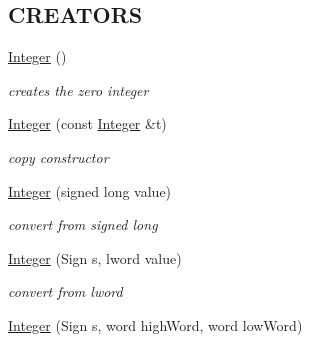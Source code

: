 \subsection*{CREATORS}
\label{_amgrp19ed50dd7d15a96072c9b6a53e8d6a1d}
 \begin{DoxyCompactItemize}
\item 
\hypertarget{class_integer_a7fcab0564d7270017ebcca55bae1a17a}{
\hyperlink{class_integer_a7fcab0564d7270017ebcca55bae1a17a}{Integer} ()}
\label{class_integer_a7fcab0564d7270017ebcca55bae1a17a}

\begin{DoxyCompactList}\small\item\em creates the zero integer \item\end{DoxyCompactList}\item 
\hypertarget{class_integer_a9e86175b4b1fb79321736974846fce70}{
\hyperlink{class_integer_a9e86175b4b1fb79321736974846fce70}{Integer} (const \hyperlink{class_integer}{Integer} \&t)}
\label{class_integer_a9e86175b4b1fb79321736974846fce70}

\begin{DoxyCompactList}\small\item\em copy constructor \item\end{DoxyCompactList}\item 
\hypertarget{class_integer_ab0536c16f441f1b5abcb2019f7d52e17}{
\hyperlink{class_integer_ab0536c16f441f1b5abcb2019f7d52e17}{Integer} (signed long value)}
\label{class_integer_ab0536c16f441f1b5abcb2019f7d52e17}

\begin{DoxyCompactList}\small\item\em convert from signed long \item\end{DoxyCompactList}\item 
\hypertarget{class_integer_a15a70886677caedd35492b495c5290e6}{
\hyperlink{class_integer_a15a70886677caedd35492b495c5290e6}{Integer} (Sign s, lword value)}
\label{class_integer_a15a70886677caedd35492b495c5290e6}

\begin{DoxyCompactList}\small\item\em convert from lword \item\end{DoxyCompactList}\item 
\hypertarget{class_integer_a834c31dcb78213e008b342c97764fd5d}{
\hyperlink{class_integer_a834c31dcb78213e008b342c97764fd5d}{Integer} (Sign s, word highWord, word lowWord)}
\label{class_integer_a834c31dcb78213e008b342c97764fd5d}


\end{DoxyCompactItemize}

